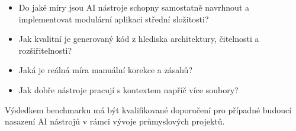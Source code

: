 \documentclass[12pt,a4paper]{article}
\begin{document}
\begin{itemize}
    \item Do jaké míry jsou AI nástroje schopny samostatně navrhnout
    a implementovat modulární aplikaci střední složitosti?
    \item Jak kvalitní je generovaný kód z hlediska architektury,
    čitelnosti a rozšiřitelnosti?
    \item Jaká je reálná míra manuální korekce a zásahů?
    \item Jak dobře nástroje pracují s kontextem napříč více soubory?
\end{itemize}

Výsledkem benchmarku má být kvalifikované doporučení
pro případné budoucí nasazení AI nástrojů v rámci
vývoje průmyslových projektů.
\end{document}
